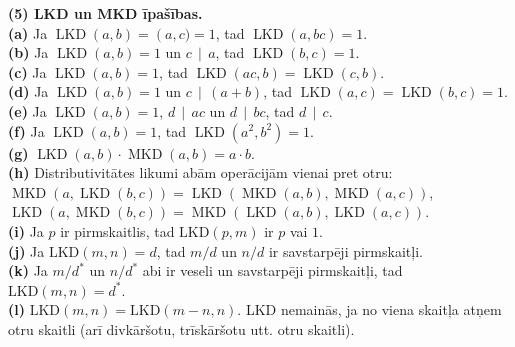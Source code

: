 \documentclass[a4paper,12pt]{article}
\begin{document}
\begin{problem}
{\bf (5) LKD un MKD īpašības.}\\
{\bf (a)} Ja $\operatorname{LKD}(a,b)=\operatorname(a,c)=1$, tad 
$\operatorname{LKD}(a,bc)=1$.\\
{\bf (b)} Ja $\operatorname{LKD}(a,b)=1$ un $c\,\mid\,a$, tad 
$\operatorname{LKD}(b,c)=1$.\\
{\bf (c)} Ja $\operatorname{LKD}(a,b)=1$, tad $\operatorname{LKD}(ac,b)
= \operatorname{LKD}(c,b)$.\\
{\bf (d)} Ja $\operatorname{LKD}(a,b)=1$ un $c\,\mid\,(a+b)$, tad
$\operatorname{LKD}(a,c) = \operatorname{LKD}(b,c)=1$.\\
{\bf (e)} Ja $\operatorname{LKD}(a,b)=1$, $d\,\mid\,ac$ un 
$d\,\mid\,bc$, tad $d\,\mid\,c$.\\
{\bf (f)} Ja $\operatorname{LKD}(a,b)=1$, 
tad $\operatorname{LKD}\left(a^2,b^2\right)=1$.\\
{\bf (g)} $\operatorname{LKD}(a,b)\cdot\operatorname{MKD}(a,b)=a \cdot b$.\\
{\bf (h)} Distributivitātes likumi abām operācijām vienai pret otru:\\
\mbox{}\hspace{20pt}$\operatorname{MKD}(a,\operatorname{LKD}(b,c)) = \operatorname{LKD}(\operatorname{MKD}(a,b),\operatorname{MKD}(a,c))$,\\
\mbox{}\hspace{20pt}$\operatorname{LKD}(a,\operatorname{MKD}(b,c)) = \operatorname{MKD}(\operatorname{LKD}(a,b),\operatorname{LKD}(a,c))$.\\
{\bf (i)} Ja $p$ ir pirmskaitlis, tad $\text{LKD}(p,m)$ ir 
$p$ vai $1$.\\
{\bf (j)} Ja $\text{LKD}(m,n) = d$, tad $m/d$ un $n/d$ ir
savstarpēji pirmskaitļi.\\
{\bf (k)} Ja $m/d^{\ast}$ un $n/d^{\ast}$ abi ir veseli 
un savstarpēji pirmskaitļi, tad 
$\text{LKD}(m,n) = d^{\ast}$.\\
{\bf (l)} $\text{LKD}(m,n) = \text{LKD}(m-n,n)$. LKD
nemainās, ja no viena skaitļa atņem otru skaitli 
(arī divkāršotu, trīskāršotu utt. otru skaitli).




\end{problem}
\end{document}
